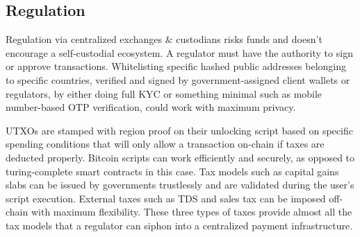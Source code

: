 \documentclass[../Bitcoin Blink.tex]{subfiles}
\begin{document}
\subsection{Regulation}
Regulation via centralized exchanges \& custodians risks funds and doesn't encourage a self-custodial ecosystem. A regulator must have the authority to sign or approve transactions. Whitelisting specific hashed public addresses belonging to specific countries, verified and signed by government-assigned client wallets or regulators, by either doing full KYC or something minimal such as mobile number-based OTP verification, could work with maximum privacy.

UTXOs are stamped with region proof on their unlocking script based on specific spending conditions that will only allow a transaction on-chain if taxes are deducted properly. Bitcoin scripts can work efficiently and securely, as opposed to turing-complete smart contracts in this case. Tax models such as capital gains slabs can be issued by governments trustlessly and are validated during the user's script execution. External taxes such as TDS and sales tax can be imposed off-chain with maximum flexibility. These three types of taxes provide almost all the tax models that a regulator can siphon into a centralized payment infrastructure.
\end{document}

